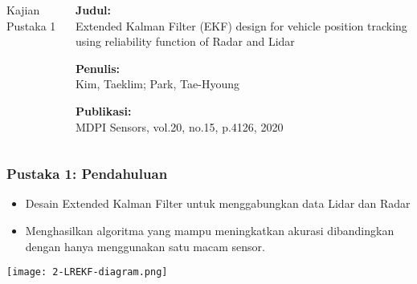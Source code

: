 \begin{frame}
    \begin{columns}
        \begin{column}{0.35\textwidth}
            \LARGE
            Kajian Pustaka 1
        \end{column}
        \begin{column}{0.6\textwidth}
            \justifying
            \textbf{Judul:}\\
            Extended Kalman Filter (EKF) design for vehicle position tracking using reliability function of Radar and Lidar

            \vspace{1.5em}

            \textbf{Penulis:}\\
            Kim, Taeklim; Park, Tae-Hyoung

            \vspace{1.5em}
            
            \textbf{Publikasi:}\\
            MDPI Sensors, vol.20, no.15, p.4126, 2020
        \end{column}
    \end{columns}
\end{frame}


\begin{frame}
    \frametitle{Pustaka 1: Pendahuluan}
    \large
    \begin{itemize}
        \justifying
        \item Desain Extended Kalman Filter untuk menggabungkan data Lidar dan Radar
        \vspace{1em}
        \item Menghasilkan algoritma yang mampu meningkatkan akurasi dibandingkan dengan hanya menggunakan satu macam sensor.
    \end{itemize}
\end{frame}


\begin{frame}
    \centering
    \texttt{[image: 2-LREKF-diagram.png]}
\end{frame}


